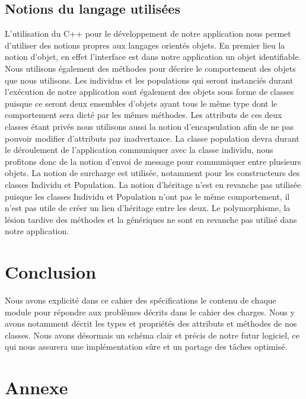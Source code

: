 \documentclass[a4paper,11pt]{article}
\begin{document}
		\subsection{Notions du langage utilisées}
			L’utilisation du C++ pour le développement de notre application nous permet d’utiliser des notions propres aux langages orientés objets.
			En premier lieu la notion d’objet, en effet l’interface est dans notre application un objet identifiable.
			Nous utilisons également des méthodes pour décrire le comportement des objets que nous utilisons.
			Les individus et les populations qui seront instanciés durant l'exécution de notre application sont également des objets sous forme de classes puisque ce seront deux ensembles d’objets ayant tous le même type dont le comportement sera dicté par les mêmes méthodes.
			Les attributs de ces deux classes étant privés nous utilisons aussi la notion d’encapsulation afin de ne pas pouvoir modifier d’attributs par inadvertance.
			La classe population devra durant le déroulement de l’application communiquer avec la classe individu, nous profitons donc de la notion d’envoi de message pour communiquer entre plusieurs objets.
			La notion de surcharge est utilisée, notamment pour les constructeurs des classes Individu et Population.
			La notion d’héritage n’est en revanche pas utilisée puisque les classes Individu et Population n’ont pas le même comportement, il n’est pas utile de créer un lien d’héritage entre les deux.
			Le polymorphisme, la lésion tardive des méthodes et la génériques ne sont en revanche pas utilisé dans notre application.\\


	\section{Conclusion}	
		Nous avons explicité dans ce cahier des spécifications le contenu de chaque module pour répondre aux problèmes décrits dans le cahier des charges.
		Nous y avons notamment décrit les types et propriétés des attributs et méthodes de nos classes.
		Nous avons désormais un schéma clair et précis de notre futur logiciel, ce qui nous assurera une implémentation sûre et un partage des tâches optimisé.
		
	\newpage
	\section{Annexe}
\end{document}
